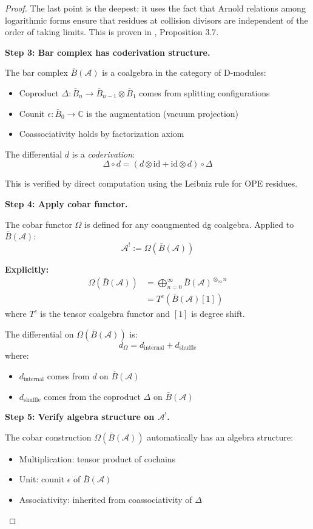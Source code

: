 \begin{proof}
The last point is the deepest: it uses the fact that Arnold relations among logarithmic forms ensure that residues at collision divisors are independent of the order of taking limits. This is proven in \cite{FM94}, Proposition 3.7.

\textbf{Step 3: Bar complex has coderivation structure.}

The bar complex $\bar{B}(\mathcal{A})$ is a coalgebra in the category of D-modules:
\begin{itemize}
\item Coproduct $\Delta: \bar{B}_n \to \bar{B}_{n-1} \otimes \bar{B}_1$ comes from splitting configurations
\item Counit $\epsilon: \bar{B}_0 \to \mathbb{C}$ is the augmentation (vacuum projection)
\item Coassociativity holds by factorization axiom 
\end{itemize}

The differential $d$ is a \textit{coderivation}:
$$\Delta \circ d = (d \otimes \text{id} + \text{id} \otimes d) \circ \Delta$$

This is verified by direct computation using the Leibniz rule for OPE residues.

\textbf{Step 4: Apply cobar functor.}

The cobar functor $\Omega$ is defined for any coaugmented dg coalgebra. Applied to $\bar{B}(\mathcal{A})$:
$$\mathcal{A}^! := \Omega(\bar{B}(\mathcal{A}))$$

\textbf{Explicitly:}
\begin{align}
\Omega(\bar{B}(\mathcal{A})) &= \bigoplus_{n=0}^{\infty} \bar{B}(\mathcal{A})^{\otimes_{\text{co}} n} \\
&= T^c(\bar{B}(\mathcal{A})[1])
\end{align}
where $T^c$ is the tensor coalgebra functor and $[1]$ is degree shift.

The differential on $\Omega(\bar{B}(\mathcal{A}))$ is:
$$d_\Omega = d_{\text{internal}} + d_{\text{shuffle}}$$
where:
\begin{itemize}
\item $d_{\text{internal}}$ comes from $d$ on $\bar{B}(\mathcal{A})$
\item $d_{\text{shuffle}}$ comes from the coproduct $\Delta$ on $\bar{B}(\mathcal{A})$
\end{itemize}

\textbf{Step 5: Verify algebra structure on $\mathcal{A}^!$.}

The cobar construction $\Omega(\bar{B}(\mathcal{A}))$ automatically has an algebra structure:
\begin{itemize}
\item Multiplication: tensor product of cochains
\item Unit: counit $\epsilon$ of $\bar{B}(\mathcal{A})$
\item Associativity: inherited from coassociativity of $\Delta$
\end{itemize}


\end{proof}
